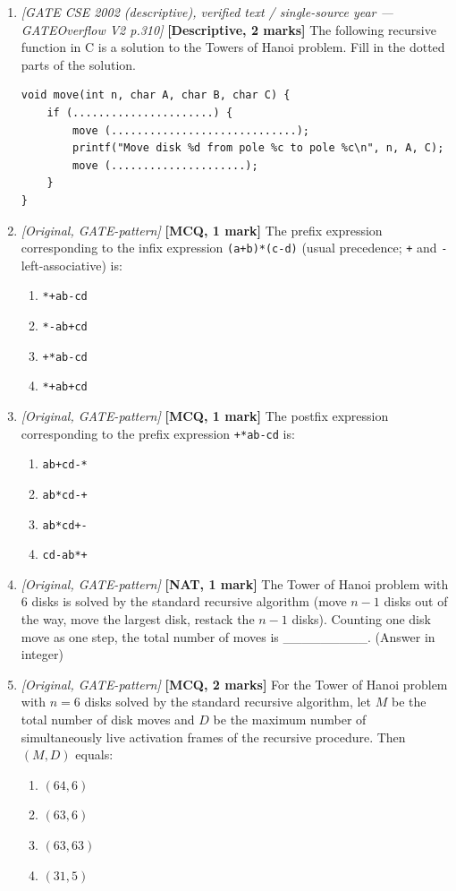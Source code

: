 \documentclass[11pt]{article}
\begin{document}
\begin{enumerate}
\item[\textbf{Q4}] \textit{[GATE CSE 2002 (descriptive), verified text / single-source year --- GATEOverflow V2 p.310]} \textbf{[Descriptive, 2 marks]} The following recursive function in C is a solution to the Towers of Hanoi problem. Fill in the dotted parts of the solution.
\begin{verbatim}
void move(int n, char A, char B, char C) {
    if (......................) {
        move (.............................);
        printf("Move disk %d from pole %c to pole %c\n", n, A, C);
        move (.....................);
    }
}
\end{verbatim}

\item[\textbf{Q5}] \textit{[Original, GATE-pattern]} \textbf{[MCQ, 1 mark]} The prefix expression corresponding to the infix expression \texttt{(a+b)*(c-d)} (usual precedence; \texttt{+} and \texttt{-} left-associative) is:
\begin{enumerate}
  \item[(A)] \texttt{*+ab-cd}
  \item[(B)] \texttt{*-ab+cd}
  \item[(C)] \texttt{+*ab-cd}
  \item[(D)] \texttt{*+ab+cd}
\end{enumerate}

\item[\textbf{Q6}] \textit{[Original, GATE-pattern]} \textbf{[MCQ, 1 mark]} The postfix expression corresponding to the prefix expression \texttt{+*ab-cd} is:
\begin{enumerate}
  \item[(A)] \texttt{ab+cd-*}
  \item[(B)] \texttt{ab*cd-+}
  \item[(C)] \texttt{ab*cd+-}
  \item[(D)] \texttt{cd-ab*+}
\end{enumerate}

\item[\textbf{Q7}] \textit{[Original, GATE-pattern]} \textbf{[NAT, 1 mark]} The Tower of Hanoi problem with $6$ disks is solved by the standard recursive algorithm (move $n-1$ disks out of the way, move the largest disk, restack the $n-1$ disks). Counting one disk move as one step, the total number of moves is \_\_\_\_\_\_\_\_\_. (Answer in integer)

\item[\textbf{Q8}] \textit{[Original, GATE-pattern]} \textbf{[MCQ, 2 marks]} For the Tower of Hanoi problem with $n = 6$ disks solved by the standard recursive algorithm, let $M$ be the total number of disk moves and $D$ be the maximum number of simultaneously live activation frames of the recursive procedure. Then $(M, D)$ equals:
\begin{enumerate}
  \item[(A)] $(64, 6)$
  \item[(B)] $(63, 6)$
  \item[(C)] $(63, 63)$
  \item[(D)] $(31, 5)$
\end{enumerate}

\end{enumerate}
\end{document}
